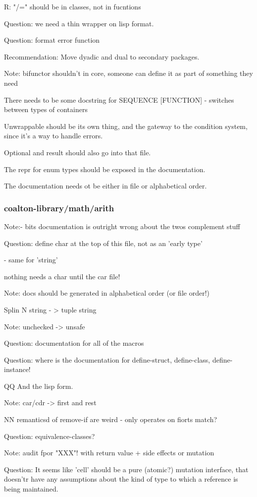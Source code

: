 \documentclass[12pt]{article}
\begin{document}
R: "/=" should be in classes, not in fucntions

Question: we need a thin wrapper on lisp format.

Question: format error function

Recommendation: Move dyadic and dual to secondary packages.

Note: bifunctor shouldn't in core, someone can define it as part of
      something they need

There needs to be some docstring for SEQUENCE [FUNCTION] - switches between types of containers

Unwrappable should be its own thing, and the gateway to the condition
system, since it's a way to handle errors.

Optional and result should also go into that file.

The repr for enum types should be exposed in the documentation.

The documentation needs ot be either in file or alphabetical order.

\subsubsection{coalton-library/math/arith}

Note:- bits documentation is outright wrong about the twos complement stuff

Question: define char at the top of this file, not as an 'early type'

    - same for 'string'

nothing needs a char until the car file!

Note: docs should be generated in alphabetical order (or file order!)

Splin N string - > tuple string

Note: unchecked -> unsafe

Question: documentation for all of the macros

Question: where is the documentation for define-struct, define-class, define-instance!

QQ And the lisp form.

Note: car/cdr -> first and rest

NN remanticsd of remove-if are weird - only operates on  fiorts match?

Question: equivalence-classes?

Note: audit fpor "XXX"! with return value + side effects or mutation

Question: It seems like 'cell' should be a pure (atomic?) mutation interface, that doesn'tr have any assumptions about the kind of type to which a reference is being maintained.
\end{document}
